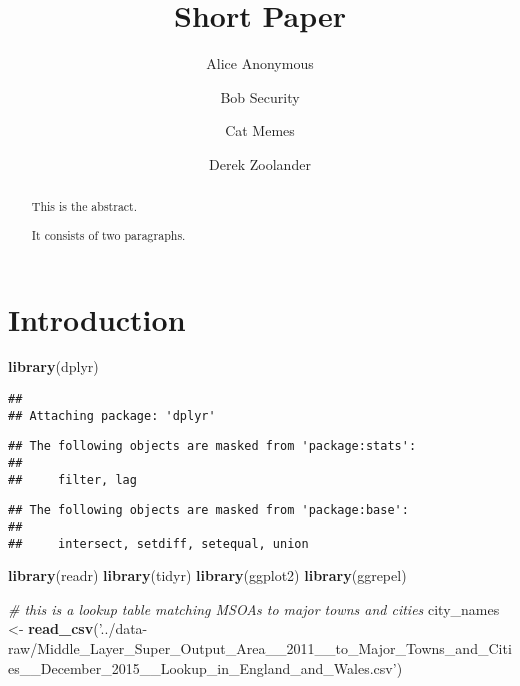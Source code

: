 \documentclass[]{elsarticle} %
\newenvironment{Shaded}{\begin{snugshade}}{\end{snugshade}}
\newcommand{\CommentTok}[1]{\textcolor[rgb]{0.56,0.35,0.01}{\textit{#1}}}
\newcommand{\KeywordTok}[1]{\textcolor[rgb]{0.13,0.29,0.53}{\textbf{#1}}}
\newcommand{\NormalTok}[1]{#1}
\newcommand{\StringTok}[1]{\textcolor[rgb]{0.31,0.60,0.02}{#1}}
\begin{document}
\begin{frontmatter}

  \title{Short Paper}
    \author[Some Institute of Technology]{Alice Anonymous}
    \author[Another University]{Bob Security}
    \author[Another University]{Cat Memes}
    \author[Some Institute of Technology]{Derek Zoolander}
      \address[Some Institute of Technology]{Department, Street, City, State, Zip}
    \address[Another University]{Department, Street, City, State, Zip}
  
  \begin{abstract}
  This is the abstract.
  
  It consists of two paragraphs.
  \end{abstract}
  
 \end{frontmatter}

\hypertarget{introduction}{%
\section{Introduction}\label{introduction}}

\begin{Shaded}
\begin{Highlighting}[]
\KeywordTok{library}\NormalTok{(dplyr)}
\end{Highlighting}
\end{Shaded}

\begin{verbatim}
## 
## Attaching package: 'dplyr'
\end{verbatim}

\begin{verbatim}
## The following objects are masked from 'package:stats':
## 
##     filter, lag
\end{verbatim}

\begin{verbatim}
## The following objects are masked from 'package:base':
## 
##     intersect, setdiff, setequal, union
\end{verbatim}

\begin{Shaded}
\begin{Highlighting}[]
\KeywordTok{library}\NormalTok{(readr)}
\KeywordTok{library}\NormalTok{(tidyr)}
\KeywordTok{library}\NormalTok{(ggplot2)}
\KeywordTok{library}\NormalTok{(ggrepel)}

\CommentTok{# this is a lookup table matching MSOAs to major towns and cities}
\NormalTok{city_names <-}\StringTok{ }\KeywordTok{read_csv}\NormalTok{(}\StringTok{'../data-raw/Middle_Layer_Super_Output_Area__2011__to_Major_Towns_and_Cities__December_2015__Lookup_in_England_and_Wales.csv'}\NormalTok{) }
\end{Highlighting}
\end{Shaded}
\end{document}

